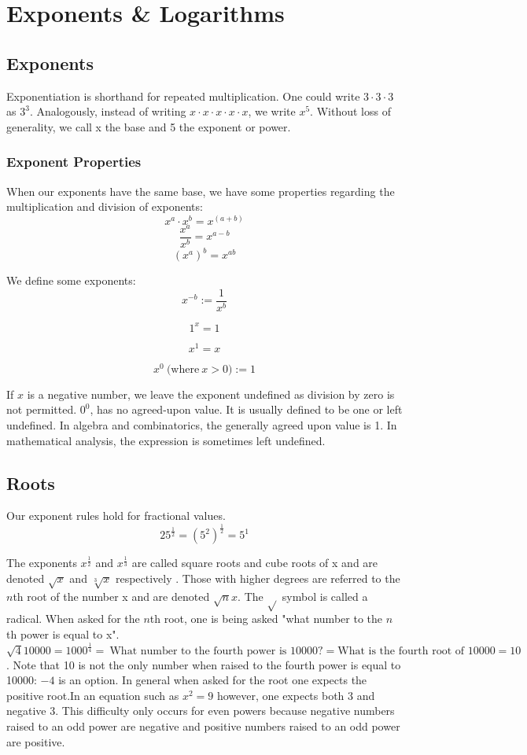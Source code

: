 \chapter{Exponents \& Logarithms}

\section*{Exponents}

Exponentiation is shorthand for repeated multiplication. One could write $3 \cdot 3 \cdot 3$ as $3^3$. Analogously, instead of writing $x \cdot x \cdot x \cdot x \cdot x$, we write $x^5$. Without loss of generality, we call x the base and 5 the exponent or power.

\subsection*{Exponent Properties}

When our exponents have the same base, we have some properties regarding the multiplication and division of exponents: $$ x^a \cdot x^b = x^{(a+b)}$$ $$ \frac{x^a}{x^b} = x^{a-b}$$ $$ (x^a)^b = x^{ab}$$

We define some exponents:
$$ x^{-b} := \frac{1}{x^b} $$

$$ 1^x = 1$$

$$ x^1 = x $$

$$ x^0 \ \text{(where} \ x > 0) := 1$$

If $x$ is a negative number, we leave the exponent undefined as division by zero is not permitted. $0^0$, has no agreed-upon value. It is usually defined to be one or left undefined. In algebra and combinatorics, the generally agreed upon value is 1. In mathematical analysis, the expression is sometimes left undefined.

\section*{Roots}

Our exponent rules hold for fractional values. $$ 25^{\frac{1}{2}} = (5^2)^{\frac{1}{2}} = 5^1$$

The exponents $x^{\frac{1}{2}}$ and $x^{\frac{1}{3}}$ are called square roots and cube roots of x and are denoted $\sqrt{x}$ and $\sqrt[3]{x}$ respectively . Those with higher degrees are referred to the $n$th root of the number x and are denoted $\sqrt{n}{x}$. The $\sqrt{}$ symbol is called a radical. When asked for the $n$th root, one is being asked "what number to the $n$th power is equal to x". $ \sqrt{4}{10000} = 1000^{\frac{1}{4}} = \ \text{What number to the fourth power is 10000?} = \text{What is the fourth root of 10000} = 10$. Note that 10 is not the only number when raised to the fourth power is equal to 10000: $-4$ is an option. In general when asked for the root one expects the positive root.In an equation such as $x^2 = 9$ however, one expects both 3 and negative 3. This difficulty only occurs for even powers because negative numbers raised to an odd power are negative and positive numbers raised to an odd power are positive.

